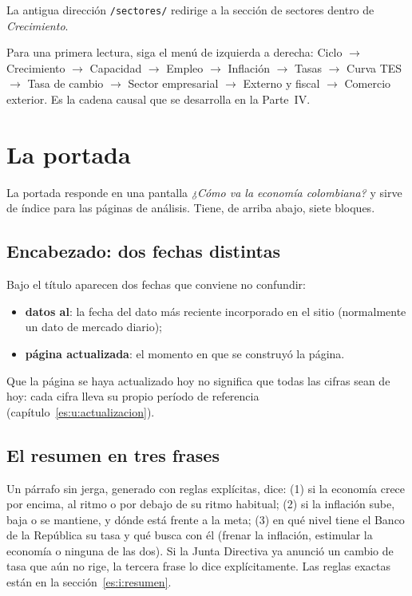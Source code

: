 La antigua dirección \texttt{/sectores/} redirige a la sección de sectores dentro de \emph{Crecimiento}.

\begin{leer}
Para una primera lectura, siga el menú de izquierda a derecha: Ciclo $\rightarrow$ Crecimiento $\rightarrow$
Capacidad $\rightarrow$ Empleo $\rightarrow$ Inflación $\rightarrow$ Tasas $\rightarrow$ Curva TES
$\rightarrow$ Tasa de cambio $\rightarrow$ Sector empresarial $\rightarrow$ Externo y fiscal $\rightarrow$
Comercio exterior. Es la cadena causal que se desarrolla en la Parte~IV.
\end{leer}

\chapter{La portada}
\label{es:u:portada}

La portada responde en una pantalla \emph{¿Cómo va la economía colombiana?} y sirve de índice para las
páginas de análisis. Tiene, de arriba abajo, siete bloques.

\section{Encabezado: dos fechas distintas}
Bajo el título aparecen dos fechas que conviene no confundir:
\begin{itemize}
\item \textbf{datos al}: la fecha del dato más reciente incorporado en el sitio (normalmente un dato de
  mercado diario);
\item \textbf{página actualizada}: el momento en que se construyó la página.
\end{itemize}
Que la página se haya actualizado hoy no significa que todas las cifras sean de hoy: cada cifra lleva su
propio período de referencia (capítulo~\ref{es:u:actualizacion}).

\section{El resumen en tres frases}
Un párrafo sin jerga, generado con reglas explícitas, dice: (1) si la economía crece por encima, al ritmo o por
debajo de su ritmo habitual; (2) si la inflación sube, baja o se mantiene, y dónde está frente a la meta; (3) en
qué nivel tiene el Banco de la República su tasa y qué busca con él (frenar la inflación, estimular la
economía o ninguna de las dos). Si la Junta Directiva ya anunció un cambio de tasa que aún no rige, la tercera
frase lo dice explícitamente. Las reglas exactas están en la sección~\ref{es:i:resumen}.

